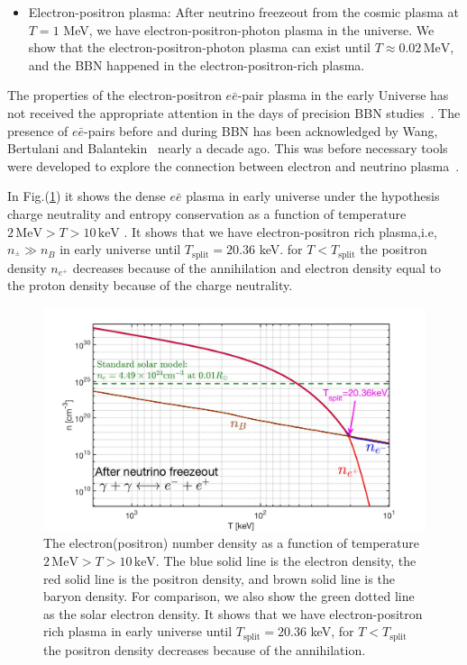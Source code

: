 \documentclass[Universe,article,submit,moreauthors,pdftex]{Definitions/mdpi}
\begin{document}
{\begin{itemize}
 \item  Electron-positron plasma: After neutrino freezeout from the cosmic plasma at $T=1$ MeV, we have electron-positron-photon plasma in  the universe. We show that the electron-positron-photon plasma can exist until $T\approx0.02\,\mathrm{MeV}$, and the BBN happened in the electron-positron-rich plasma.
\end{itemize}
The properties of the electron-positron  $e\bar e$-pair plasma in the early Universe has not received the appropriate attention in the days of precision BBN studies~\cite{Pitrou:2018cgg}. The presence of $e\bar e$-pairs before and during BBN has been acknowledged by Wang, Bertulani and Balantekin~\cite{Wang:2010px} nearly a decade ago. This was before necessary tools were developed to explore the connection between electron and neutrino plasma~\cite{Mangano:2005cc,Birrell:2012gg,Birrell:2014uka}. 

In Fig.(\ref{Density_fig}) it shows the dense $e\bar e$ plasma in early universe under the hypothesis charge neutrality and entropy conservation as a function of temperature $2\,\mathrm{MeV}>T>10\,\mathrm{keV}$ \cite{Chris:2023abc}. It shows  that we have electron-positron rich plasma,i.e, $n_{^\pm}\gg n_B$ in early universe until $T_{\mathrm{split}} = 20.36$ keV. for $T<T_{\mathrm{split}} $ the positron density $n_{e^+}$ decreases because of the annihilation and electron density equal to the proton density because of the charge neutrality.

}
\begin{figure}[h]
\centering
\includegraphics[width=0.75\linewidth]{./plots/NewDensity_cm3.jpg}
\caption{The electron(positron) number density as a function of temperature $2\,\mathrm{MeV}>T>10\,\mathrm{keV}$. The blue solid line is the electron density, the red solid line is the positron density, and brown solid line is the baryon density. For comparison, we also show the green dotted line as the solar electron density. It shows  that we have electron-positron rich plasma in early universe until $T_{\mathrm{split}} = 20.36$ keV, for $T<T_{\mathrm{split}} $ the positron density decreases because of the annihilation.}
\label{Density_fig} 
\end{figure}
\end{document}
